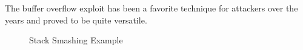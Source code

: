 The buffer overflow exploit has been a favorite technique for attackers over the years and proved to be quite versatile\cite{taeho1999adv.overflow}.

\begin{figure}[htp]%
	\centering
	\caption[Stack Smashing Example]{%
		Stack Smashing Example%
		\footnotemark
	}
	\label{fig:stackoverflow}
\end{figure}

